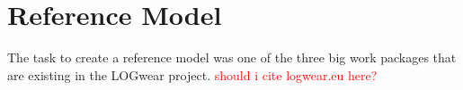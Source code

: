 \section{Reference Model}\label{sec:referenceArchitecture}
The task to create a reference model was one of the three big work packages that are existing in the LOGwear project. \textcolor{red}{should i cite logwear.eu here?} 